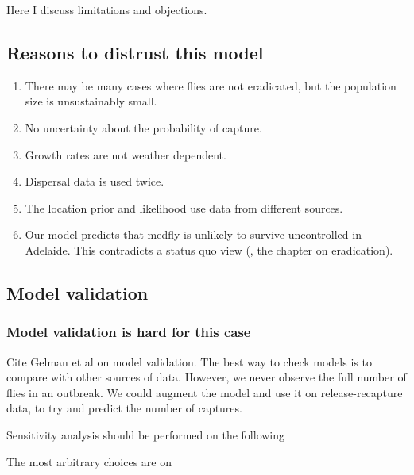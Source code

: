 \documentclass[
  oneside]{book}
\providecommand{\tightlist}{%
  \setlength{\itemsep}{0pt}\setlength{\parskip}{0pt}}
\begin{document}
Here I discuss limitations and objections.

\hypertarget{reasons-to-distrust-this-model}{%
\subsection{Reasons to distrust this model}\label{reasons-to-distrust-this-model}}

\begin{enumerate}
\def\labelenumi{\arabic{enumi}.}
\tightlist
\item
  There may be many cases where flies are not eradicated, but the population size is unsustainably small.
\item
  No uncertainty about the probability of capture.
\item
  Growth rates are not weather dependent.
\item
  Dispersal data is used twice.
\item
  The location prior and likelihood use data from different sources.
\item
  Our model predicts that medfly is unlikely to survive uncontrolled in Adelaide. This contradicts a status quo view (\citet{PIRSA}, the chapter on eradication).
\end{enumerate}

\hypertarget{model-validation}{%
\subsection{Model validation}\label{model-validation}}

\hypertarget{model-validation-is-hard-for-this-case}{%
\subsubsection{Model validation is hard for this case}\label{model-validation-is-hard-for-this-case}}

Cite Gelman et al on model validation. The best way to check models is to compare with other sources of data. However, we never observe the full number of flies in an outbreak. We could augment the model and use it on release-recapture data, to try and predict the number of captures.

Sensitivity analysis should be performed on the following

The most arbitrary choices are on
\end{document}
